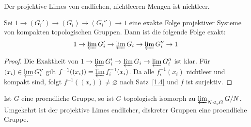\documentclass[11pt,a4paper,openany]{memoir}
\begin{document}
\iffalse
\begin{proof}
Für $\nu\leq\mu$ setze:
\[U_{\mu\nu}:=\Big\{(x_\lambda)\in\prod_{\lambda\in\Lambda}X_\lambda \mid \varphi_{\mu\nu}(x_\mu)\neq x_\nu \Big\} \]
Diese sind offene Teilmengen von $\prod X_\lambda$, da alle $\varphi_{\mu\nu}$ stetig sind. Jede endliche Vereinigung von Mengen der Form $U_{\mu\nu}$ ist echt in $\prod X_\lambda$ enthalten: Wähle dazu ein $\kappa\in \Lambda$ mit $\kappa\geq \mu,\nu$ für alle Mengen $U_{\mu\nu}$, die in der Vereinigung auftauchen. Wähle $x_\kappa\in X_\kappa$ beliebig und setze:
\[x_\lambda=\begin{cases}
\varphi_{\kappa\lambda}(x_\kappa),&\lambda\leq\kappa\\
\text{beliebiges Element in }X_\lambda,&\text{sonst}
\end{cases} \]
Dann liegt $(x_\lambda)$ nicht in der Vereinigung der $U_{\mu\nu}$. Nun ist die Vereinigung aller $U_{\mu\nu}$ das Komplement von $\varprojlim X_\lambda$ in $\prod X_\lambda$. Somit ist $\varprojlim X_\lambda$ abgeschlossen, also kompakt, da $\prod X_\lambda$ nach Tychonoff kompakt ist. Wäre nun $\varprojlim X_\lambda\neq\varnothing$, würden die $U_{\mu\nu}$ ganz $\prod X_\lambda$ überdecken. Also existiert eine endliche Teilüberdeckung, ein Widerspruch.
\end{proof}
\fi

\begin{corollary}\label{1.4cor}
Der projektive Limes von endlichen, nichtleeren Mengen ist nichtleer. 
\end{corollary}

\begin{corollary}\label{prop:compact-exact-limes}
Sei $1\to (G_i')\to (G_i) \to (G_i'')\to 1$ eine exakte Folge projektiver Systeme von kompakten topologischen Gruppen. Dann ist die folgende Folge exakt:
\[1\to\varprojlim G_i'\to\varprojlim G_i  \to \varprojlim G_i''\to 1 \]
\end{corollary}

\iffalse
\begin{proof}
Die Exaktheit von $1\to\varprojlim G_i'\to\varprojlim G_i\to\varprojlim G_i''$ ist klar. Für $(x_i)\in\varprojlim G_i''$ gilt $f^{-1}((x_i))=\varprojlim f_i^{-1}(x_i)$. Da alle $f_i^{-1}(x_i)$ nichtleer und kompakt sind, folgt $f^{-1}((x_i))\neq\varnothing$ nach Satz~\ref{1.4} und $f$ ist surjektiv.
\end{proof}

\begin{proposition}\label{1.3}
Ist $G$ eine proendliche Gruppe, so ist $G$ topologisch isomorph zu $\varprojlim_{N\lhd_\text{o} G} G/N$. Umgekehrt ist der projektive Limes endlicher, diskreter Gruppen eine proendliche Gruppe.
\end{proposition}
\end{document}
